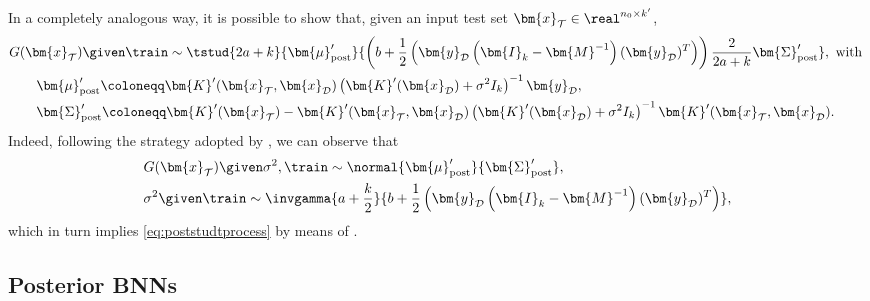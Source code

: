 \begin{remark} \label{rem:poststudtprocess}
    In a completely analogous way, it is possible to show that, given an input test set $\bm{x}_{\mathcal{T}} \in \real^{n_0 \times k'}$, 
    \begin{equation} \label{eq:poststudtprocess}
        \begin{aligned}
            & G(\bm{x}_{\mathcal{T}}) \given \train \sim \tstud{2a + k}{\bm{\mu}'_{\mathrm{post}}}{\left(b + \frac{1}{2} \left(\bm{y}_{\mathcal{D}} \left(\bm{I}_{k} - \bm{M}^{-1}\right) (\bm{y}_{\mathcal{D}})^T\right)\right) \frac{2}{2a + k} \bm{\Sigma}'_{\mathrm{post}}}, \text{ with } \\
            & \kern20pt \bm{\mu}'_{\mathrm{post}} \coloneqq \bm{K}'(\bm{x}_{\mathcal{T}}, \bm{x}_{\mathcal{D}}) \left(\bm{K}'(\bm{x}_{\mathcal{D}}) + \sigma^2 I_{k}\right)^{-1} \bm{y}_{\mathcal{D}}, \\
            & \kern20pt \bm{\Sigma}'_{\mathrm{post}} \coloneqq \bm{K}'(\bm{x}_{\mathcal{T}}) - \bm{K}'(\bm{x}_{\mathcal{T}}, \bm{x}_{\mathcal{D}}) \left(\bm{K}'(\bm{x}_{\mathcal{D}}) + \sigma^2 I_{k}\right)^{-1} \bm{K}'(\bm{x}_{\mathcal{T}}, \bm{x}_{\mathcal{D}}). \\
        \end{aligned}
    \end{equation}
    Indeed, following the strategy adopted by \citet[eqs. (2.22) to (2.24)]{gp2006}, we can observe that
    \begin{align*}
        & G(\bm{x}_{\mathcal{T}}) \given \sigma^2, \train \sim \normal{\bm{\mu}'_{\mathrm{post}}}{\bm{\Sigma}'_{\mathrm{post}}}, \\
        & \sigma^2 \given \train \sim \invgamma{a + \frac{k}{2}}{b + \frac{1}{2} \left(\bm{y}_{\mathcal{D}} \left(\bm{I}_{k} - \bm{M}^{-1}\right) (\bm{y}_{\mathcal{D}})^T\right)},
    \end{align*}
    which in turn implies \cref{eq:poststudtprocess} by means of .
\end{remark}

\subsection{Posterior BNNs} \label{subsec:postbnn}

